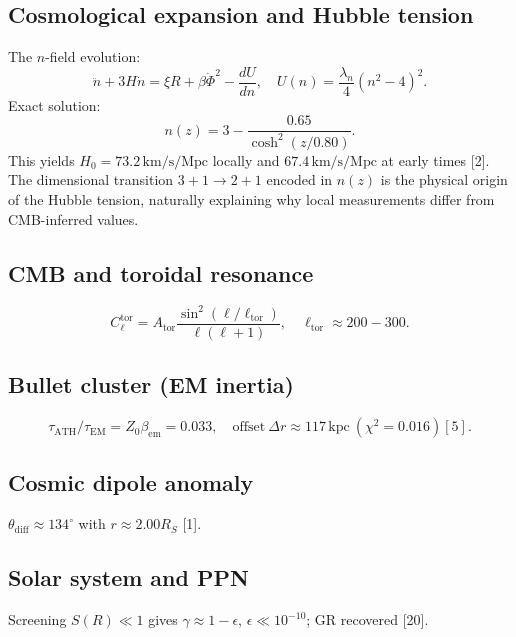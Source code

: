 \documentclass[11pt,a4paper]{article}
\begin{document}
\subsection{Cosmological expansion and Hubble tension}
\label{subsec:hubble}
The \(n\)-field evolution:
\[
\ddot{n} + 3H\dot{n} = \xi R + \beta \dot{\Phi}^2 - \frac{dU}{dn},\quad U(n) = \frac{\lambda_n}{4}(n^2 - 4)^2. \tag{34}
\]
Exact solution:
\[
n(z) = 3 - \frac{0.65}{\cosh^2(z/0.80)}. \tag{35}
\]
This yields \(H_0 = 73.2\,\mathrm{km/s/Mpc}\) locally and \(67.4\,\mathrm{km/s/Mpc}\) at early times [2]. The dimensional transition \(3+1 \to 2+1\) encoded in \(n(z)\) is the physical origin of the Hubble tension, naturally explaining why local measurements differ from CMB-inferred values.

\subsection{CMB and toroidal resonance}
\label{subsec:cmb}
\[
C_\ell^{\mathrm{tor}} = A_{\mathrm{tor}} \frac{\sin^2(\ell/\ell_{\mathrm{tor}})}{\ell(\ell+1)},\quad \ell_{\mathrm{tor}} \approx 200-300. \tag{36}
\]

\subsection{Bullet cluster (EM inertia)}
\label{subsec:bullet}
\[
\tau_{\mathrm{ATH}} / \tau_{\mathrm{EM}} = Z_0 \beta_{\mathrm{em}} = 0.033,\quad \mathrm{offset}\ \Delta r \approx 117\,\mathrm{kpc}\ (\chi^2 = 0.016) [5].
\]

\subsection{Cosmic dipole anomaly}
\label{subsec:dipole}
\(\theta_{\mathrm{diff}} \approx 134^\circ\) with \(r \approx 2.00 R_S\) [1].

\subsection{Solar system and PPN}
\label{subsec:ppn}
Screening \(S(R) \ll 1\) gives \(\gamma \approx 1 - \epsilon\), \(\epsilon \ll 10^{-10}\); GR recovered [20].
\end{document}
